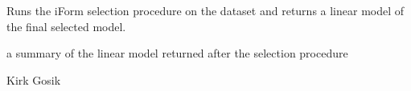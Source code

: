 \documentclass[letterpaper]{book}
\begin{document}
%
\begin{Details}\relax
Runs the iForm selection procedure on the dataset and returns a linear model
of the final selected model.
\end{Details}
%
\begin{Value}
a summary of the linear model returned after the selection procedure
\end{Value}
%
\begin{Author}\relax
Kirk Gosik
\end{Author}
\printindex{}
\end{document}

